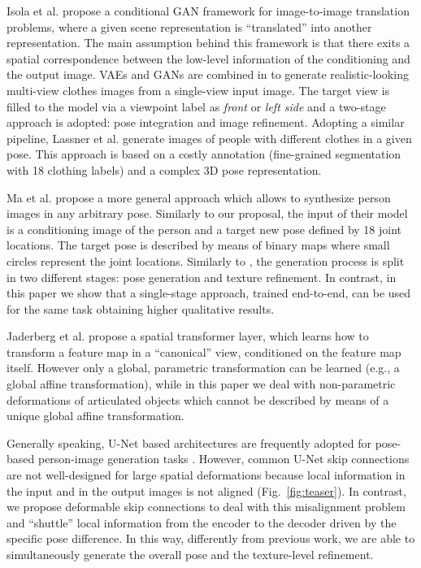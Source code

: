 \documentclass[10pt,twocolumn,letterpaper]{article}
\begin{document}
 Isola et al. \cite{pix2pix2016} propose a  conditional GAN framework for image-to-image translation problems,
 where a given scene representation is ``translated'' into another representation.
The main assumption behind this framework is that there exits a spatial correspondence between the low-level information of the conditioning and the output image. 
VAEs and GANs are combined in \cite{ZhaoWCLF17} to generate realistic-looking multi-view clothes images from  a single-view
input image. The target view is filled to the model via a viewpoint label as \emph{front} or \emph{left side} and a two-stage approach is adopted: pose integration and image refinement.
Adopting a similar pipeline, Lassner et al. \cite{LassnerPG17} generate images of people with different clothes in a given pose. 
This approach is based on a costly annotation (fine-grained segmentation with 18 clothing labels) and a complex  3D pose representation. 

Ma et al. \cite{ma2017pose} propose  a more general approach  which allows to synthesize person images in any arbitrary pose. Similarly to our proposal, the input of their  model is a conditioning image of the person and a target new pose defined by 18 joint locations. The target pose is described by means of binary maps where small circles represent the joint locations. Similarly to \cite{LassnerPG17,ZhaoWCLF17},
the generation process is split in two different stages: pose generation and texture refinement. In contrast, in this paper we show that a single-stage approach, trained end-to-end, can be used for the same task obtaining higher qualitative results.



Jaderberg et al. \cite{jaderberg2015spatial}  propose a
 spatial transformer layer, which learns how to transform a feature map in a ``canonical'' view, conditioned on the feature map
itself.
However only a global,  parametric  transformation can be learned (e.g., a global affine transformation), while in this paper we deal with  non-parametric deformations of articulated objects which cannot be described by means of a unique global affine transformation.


Generally speaking,
  U-Net based architectures are frequently adopted for
pose-based person-image generation tasks \cite{LassnerPG17,ma2017pose,Walker2017pose,ZhaoWCLF17}. However, common U-Net skip connections  are not well-designed for large spatial deformations  because local information in the input and in the output images is not  aligned (Fig.~\ref{fig:teaser}).
In contrast, we propose deformable skip connections to deal with this misalignment problem and ``shuttle'' local information from the encoder to the decoder driven by the specific pose difference.
In this way, differently from previous work, we are able to simultaneously  generate
the overall pose and the texture-level refinement.
 
\end{document}
